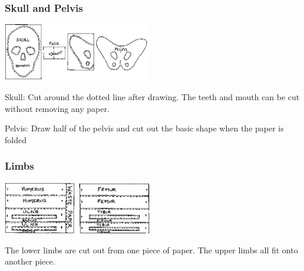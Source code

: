 \begin{multicols}{2}
\subsubsection{Skull and Pelvis}

\begin{center}
\includegraphics[width=0.49\textwidth]{./img/source/skeleton-skull-pelvis.png}
\end{center}

\begin{description*}
\item[Skull:]{Cut around the dotted line after
drawing. The teeth and mouth
can be cut without removing any
paper.}
\item[Pelvis:]{Draw half of the pelvis and cut out the basic shape when the paper is
folded}
\end{description*}

\columnbreak

\subsubsection{Limbs}

\begin{center}
\includegraphics[width=0.49\textwidth]{./img/source/skeleton-limbs.png}
\end{center}
The lower limbs are cut out from one piece of paper. The upper limbs
all fit onto another piece.


\end{multicols}
